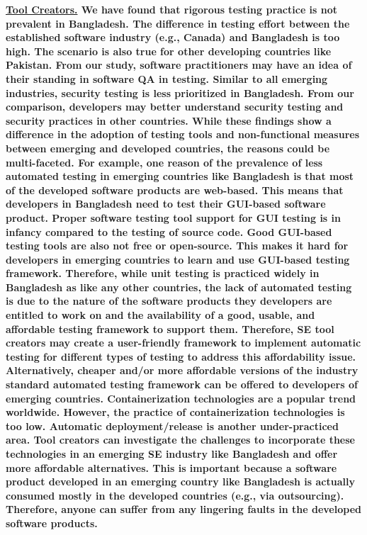\bf{\ul{Tool Creators.}} We have found that rigorous testing practice
is not prevalent in Bangladesh. The difference in testing effort between the
established software industry (e.g., Canada) and Bangladesh is too high. The
scenario is also true for other developing countries like Pakistan. From our
study, software practitioners may have an idea of their standing in software QA
in testing. Similar to all emerging industries, security testing is less
prioritized in Bangladesh. From our comparison, developers may better understand
security testing and security practices in other countries. While these findings show a 
difference in the adoption of testing tools and non-functional measures 
between emerging and developed countries, the reasons could be multi-faceted. 
For example, one reason of the prevalence of less automated testing in emerging countries 
like Bangladesh is that most of the developed software products are web-based. This means 
that developers in Bangladesh need to test their GUI-based software product. 
Proper software testing tool support for GUI testing is in infancy compared to 
the testing of source code. Good GUI-based testing tools are also not 
free or open-source. This makes it hard for developers in emerging countries to 
learn and use GUI-based testing framework. Therefore, 
while unit testing is practiced widely in Bangladesh as like any other countries, 
the lack of automated testing is due to the nature of the software products 
they developers are entitled to work on and the availability of a good, usable, and affordable 
testing framework to support them. Therefore, SE tool creators may create a
user-friendly framework to implement automatic testing for different types of
testing to address this affordability issue. Alternatively, 
cheaper and/or more affordable versions of the industry standard automated testing framework 
can be offered to developers of emerging countries. Containerization technologies are a popular trend worldwide. However, the
practice of containerization technologies is too low. Automatic
deployment/release is another under-practiced area. Tool creators can investigate
the challenges to incorporate these technologies in an emerging SE industry like
Bangladesh and offer more affordable alternatives. This is important because a software 
product developed in an emerging country like Bangladesh is actually consumed mostly in the developed 
countries (e.g., via outsourcing). Therefore, anyone can suffer from any lingering faults in the developed software products.


